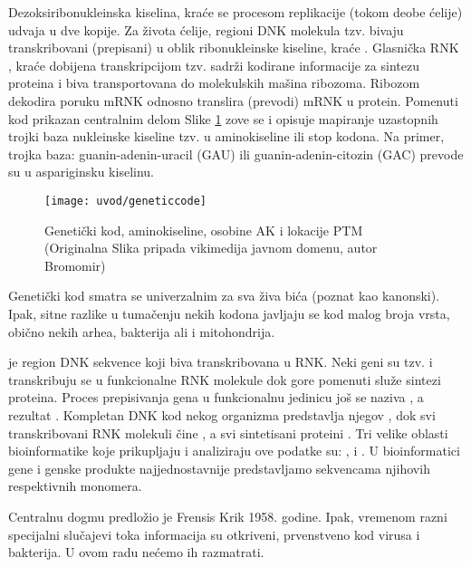 Dezoksiribonukleinska kiselina, kraće  se procesom replikacije
(tokom deobe ćelije) udvaja u dve kopije. Za života ćelije, regioni DNK
molekula tzv.  bivaju transkribovani (prepisani) u oblik
ribonukleinske kiseline, kraće . Glasnička RNK , kraće 
dobijena transkripcijom tzv.  sadrži kodirane informacije
za sintezu proteina i biva transportovana do molekulskih mašina ribozoma.
Ribozom dekodira poruku mRNK odnosno translira (prevodi) mRNK  u protein.
Pomenuti kod prikazan centralnim delom Slike \ref{fig:kod} zove se
 i opisuje mapiranje uzastopnih trojki baza nukleinske
kiseline tzv.  u aminokiseline ili stop kodona. Na primer,
trojka baza: guanin-adenin-uracil (GAU) ili guanin-adenin-citozin (GAC) prevode
su u aspariginsku kiselinu.

\begin{figure}[]
\centering
\hspace*{-2.3cm} 
\texttt{[image: uvod/geneticcode]}
\caption { Genetički kod, aminokiseline, osobine AK i lokacije PTM\\
  \footnotesize
(Originalna Slika pripada vikimedija javnom domenu, autor Bromomir)}
\label{fig:kod}
\end{figure}

\clearpage

Genetički kod smatra se univerzalnim za sva živa bića (poznat kao kanonski).
Ipak, sitne razlike u tumačenju nekih kodona javljaju se kod malog broja vrsta,
obično nekih arhea, bakterija ali i mitohondrija.

 je region DNK sekvence
koji biva transkribovana u RNK.  Neki geni su tzv.   i
transkribuju se u funkcionalne RNK molekule dok gore pomenuti 
služe sintezi proteina.  Proces prepisivanja gena u funkcionalnu jedinicu još
se naziva , a rezultat .
Kompletan DNK kod nekog organizma predstavlja njegov
, dok  svi transkribovani RNK molekuli čine ,
a svi sintetisani proteini .  Tri velike oblasti
bioinformatike koje prikupljaju i analiziraju ove podatke su:
,  i .
U bioinformatici gene i genske produkte najjednostavnije predstavljamo
sekvencama njihovih respektivnih monomera.


Centralnu dogmu predložio je Frensis Krik 1958. godine. Ipak, vremenom 
razni specijalni slučajevi toka informacija su otkriveni, prvenstveno kod
virusa i bakterija. U ovom radu nećemo ih razmatrati.

